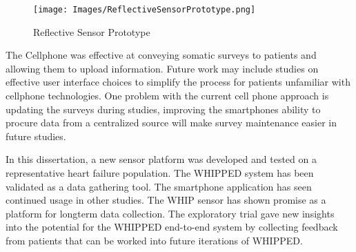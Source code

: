 \begin{figure}
\centering
\texttt{[image: Images/ReflectiveSensorPrototype.png]}
\caption{Reflective Sensor Prototype }
\label{fig:ReflectiveSensorPrototypes}
\end{figure}


The Cellphone was effective at conveying somatic surveys to patients and allowing them to upload information. Future work may include studies on effective user interface choices to simplify the process for patients unfamiliar with cellphone technologies. One problem with the current cell phone approach is updating the surveys during studies, improving the smartphones ability to procure data from a centralized source will make survey maintenance easier in future studies.

In this dissertation, a new sensor platform was developed and tested on a representative heart failure population. The WHIPPED system has been validated as a data gathering tool. The smartphone application has seen continued usage in other studies. The WHIP sensor has shown promise as a platform for longterm data collection. The exploratory trial gave new insights into the potential for the WHIPPED end-to-end system by collecting feedback from patients that can be worked into future iterations of WHIPPED.

